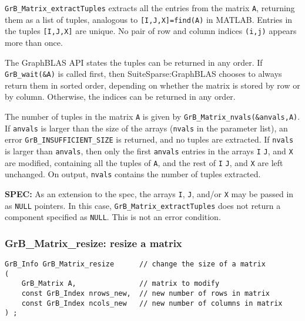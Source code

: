 \documentclass[12pt]{article}
\begin{document}
\verb'GrB_Matrix_extractTuples' extracts all the entries from the matrix
\verb'A', returning them as a list of tuples, analogous to
\verb'[I,J,X]=find(A)' in MATLAB.  Entries in the tuples \verb'[I,J,X]' are
unique.  No pair of row and column indices \verb'(i,j)' appears more than once.

The GraphBLAS API states the tuples can be returned in any order.  If
\verb'GrB_wait(&A)' is called first, then SuiteSparse:GraphBLAS chooses to
always return them in sorted order, depending on whether the matrix is stored
by row or by column.  Otherwise, the indices can be returned in any order.

The number of tuples in the matrix \verb'A' is given by
\verb'GrB_Matrix_nvals(&anvals,A)'.  If \verb'anvals' is larger than the size
of the arrays (\verb'nvals' in the parameter list), an error
\verb'GrB_INSUFFICIENT_SIZE' is returned, and no tuples are extracted.  If
\verb'nvals' is larger than \verb'anvals', then only the first \verb'anvals'
entries in the arrays \verb'I' \verb'J', and \verb'X' are modified, containing
all the tuples of \verb'A', and the rest of \verb'I' \verb'J', and \verb'X' are
left unchanged.  On output, \verb'nvals' contains the number of tuples
extracted.

\begin{alert}
{\bf SPEC:} As an extension to the spec, the arrays \verb'I', \verb'J', and/or
\verb'X' may be passed in as \verb'NULL' pointers.  In this case,
\verb'GrB_Matrix_extractTuples' does not return a component specified as
\verb'NULL'.  This is not an error condition.
\end{alert}

\newpage
\subsubsection{{\sf GrB\_Matrix\_resize:}          resize a matrix}
\label{matrix_resize}

\begin{mdframed}[userdefinedwidth=6in]
{\footnotesize
\begin{verbatim}
GrB_Info GrB_Matrix_resize      // change the size of a matrix
(
    GrB_Matrix A,               // matrix to modify
    const GrB_Index nrows_new,  // new number of rows in matrix
    const GrB_Index ncols_new   // new number of columns in matrix
) ;
\end{verbatim} } \end{mdframed}
\end{document}
